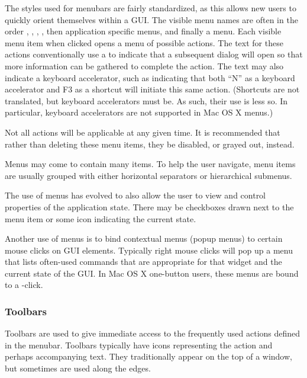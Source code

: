 The styles used for menubars are fairly standardized, as this allows
new users to quickly orient themselves within a GUI. The visible menu
names are often in the order , , ,
, then application specific menus, and finally a
 menu. Each visible menu item when clicked opens a menu of
possible actions. The text for these actions conventionally use a
  to indicate that a subsequent dialog will open so that
more information can be gathered to complete the action. The text may
also indicate a keyboard accelerator, such as  indicating that both ``N'' as a keyboard
accelerator and F3 as a shortcut will initiate this same
action. (Shortcuts are not translated, but keyboard accelerators must
be. As such, their use is less so. In particular, keyboard
accelerators are not supported in Mac OS X menus.)

Not all actions will be applicable at any given time. It is
recommended that rather than deleting these menu items, they be
disabled, or grayed out, instead. %

Menus may come to contain many items. To help the user navigate, menu
items are usually grouped with either horizontal separators or
hierarchical submenus. %

The use of menus has evolved to also allow the user to view and
control properties of the application state. There may be
checkboxes drawn next to the menu item or some icon indicating the
current state.

Another use of menus is to bind contextual menus (popup menus) to
certain mouse clicks on GUI elements. Typically right mouse clicks
will pop up a menu that lists often-used commands that are appropriate
for that widget and the current state of the GUI. In Mac OS X
one-button users, these menus are bound to a -click.

\subsubsection{Toolbars}
\label{sec:GUI:toolbars}

Toolbars are used to give immediate access to the frequently used actions
defined in the menubar. Toolbars typically have icons representing the
action and perhaps accompanying text. They traditionally appear on the
top of a window, but sometimes are used along the edges. 

